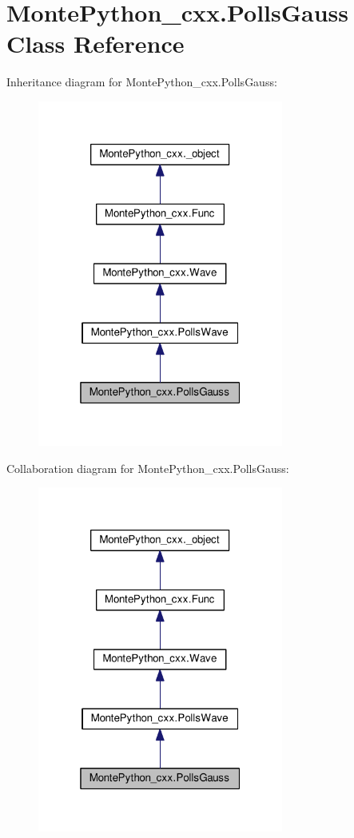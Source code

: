 \hypertarget{classMontePython__cxx_1_1PollsGauss}{}\section{Monte\+Python\+\_\+cxx.\+Polls\+Gauss Class Reference}
\label{classMontePython__cxx_1_1PollsGauss}


Inheritance diagram for Monte\+Python\+\_\+cxx.\+Polls\+Gauss\+:
\nopagebreak
\begin{figure}[H]
\begin{center}
\leavevmode
\includegraphics[width=229pt]{classMontePython__cxx_1_1PollsGauss__inherit__graph}
\end{center}
\end{figure}


Collaboration diagram for Monte\+Python\+\_\+cxx.\+Polls\+Gauss\+:
\nopagebreak
\begin{figure}[H]
\begin{center}
\leavevmode
\includegraphics[width=229pt]{classMontePython__cxx_1_1PollsGauss__coll__graph}
\end{center}
\end{figure}
